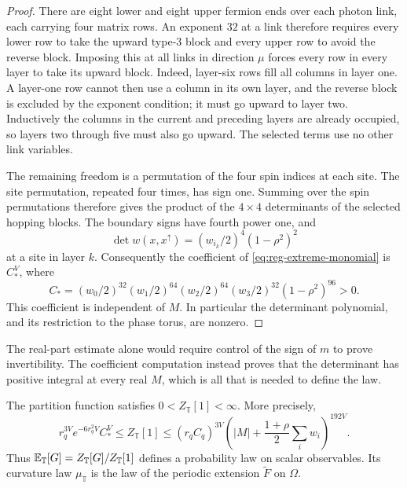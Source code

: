 \begin{proof}
There are eight lower and eight upper fermion ends over each photon
link, each carrying four matrix rows. An exponent $32$ at a link
therefore requires every lower row to take the upward type-$3$
block and every upper row to avoid the reverse block. Imposing this
at all links in direction $\mu$ forces every row in every layer to
take its upward block. Indeed, layer-six rows fill all columns in
layer one. A layer-one row cannot then use a column in its own layer,
and the reverse block is excluded by the exponent condition; it must
go upward to layer two. Inductively the columns in the current and
preceding layers are already occupied, so layers two through five
must also go upward. The selected terms use no other link variables.

The remaining freedom is a permutation of the four spin indices at
each site. The site permutation, repeated four times, has sign one.
Summing over the spin permutations therefore gives the product of
the $4\times4$ determinants of the selected hopping blocks. The
boundary signs have fourth power one, and
\[
 \det w(x,x^\uparrow)
   =(w_{i_k}/2)^4(1-\rho^2)^2
\]
at a site in layer $k$. Consequently the coefficient of
\eqref{eq:reg-extreme-monomial} is $C_*^V$, where
\begin{equation}\label{eq:reg-extreme-coefficient}
 C_*=(w_0/2)^{32}(w_1/2)^{64}(w_2/2)^{64}(w_3/2)^{32}
                                           (1-\rho^2)^{96}>0.
\end{equation}
This coefficient is independent of $M$. In particular the determinant
polynomial, and its restriction to the phase torus, are nonzero.
\end{proof}

The real-part estimate alone would require control of the sign of
$m$ to prove invertibility. The coefficient computation instead
proves that the determinant has positive integral at every real $M$,
which is all that is needed to define the law.

\begin{proposition}\label{prop:reg-partition}
The partition function satisfies $0<Z_{\mathbb T}[1]<\infty$.
More precisely,
\begin{equation}\label{eq:reg-partition-bounds}
 r_q^{3V}e^{-6r_q^2V}C_*^V
 \le Z_{\mathbb T}[1]
 \le(r_qC_q)^{3V}\left(|M|+\frac{1+\rho}{2}\sum_iw_i\right)^{192V}.
\end{equation}
Thus $\mathbb E_{\mathbb T}[G]=Z_{\mathbb T}[G]/Z_{\mathbb T}[1]$ defines a
probability law on scalar observables. Its curvature law
$\mu_{\mathbb T}$ is the law of the periodic extension $\widetilde F$
on $\Omega$.
\end{proposition}

